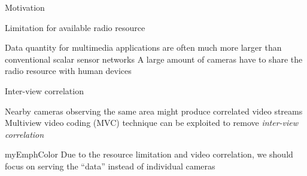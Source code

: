 \begin{frame}{Motivation}
%
\begin{itemize}
	\myItem Limitation for available radio resource
	\begin{itemize}
		\mySubItem Data quantity for multimedia applications are often much more larger than conventional scalar sensor networks
		\mySubItem A large amount of cameras have to share the radio resource with human devices
	\end{itemize}
	\myItem Inter-view correlation
	\begin{itemize}
		\mySubItem Nearby cameras observing the same area might produce correlated video streams
		\mySubItem Multiview video coding (MVC) technique can be exploited to remove \emph{inter-view correlation}
	\end{itemize}
\end{itemize}
%
\begin{beamercolorbox}[shadow=true,rounded=true]{myEmphColor}
Due to the resource limitation and video correlation, we should focus on serving the ``data'' instead of individual cameras
\end{beamercolorbox}
%
\end{frame}